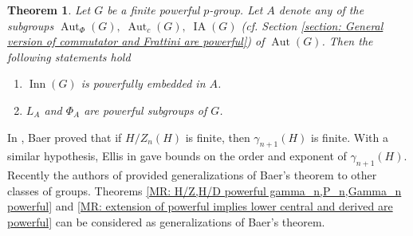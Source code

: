 \documentclass[12pt]{elsarticle}
\makeatletter
\newtheorem{theorem}{Theorem}[section]
\newtheorem*{main corollary*}{Main Corollary}
\theoremstyle{definition}
\newcommand{\settheoremtag}[1]{%
  \let\oldthetheorem\thetheorem%
  \renewcommand{\thetheorem}{#1}%
  \g@addto@macro\endtheorem{%
    \global\let\thetheorem\oldthetheorem}%
  }
\makeatother
\begin{document}
\settheoremtag{D}
\begin{theorem} \label{MR: Inn G pe Automorphism subgroups and L_A and Phi_A powerful}
Let $G$ be a finite powerful $p$-group. 
Let $A$ denote any of the subgroups $\operatorname{Aut}_\Phi(G),\; \operatorname{Aut}_c(G),\; \operatorname{IA}(G)$ (cf. Section \ref{section: General version of commutator and Frattini are powerful}) of $\operatorname{Aut}(G)$. Then the following statements hold
\begin{enumerate}
\item[(i)]  $\operatorname{Inn}(G)$ is powerfully embedded in $A$.
\item[(ii)] $L_A$ and $\Phi_A$ are powerful subgroups of $G$.
\end{enumerate}
\end{theorem}

In \cite{Baer52}, Baer proved that if $H/Z_n(H)$ is finite, then $\gamma_{n+1}(H)$ is finite. With a similar hypothesis, Ellis in \cite{Ellis2001} gave bounds on the order and exponent of $\gamma_{n+1}(H)$.  Recently the authors of \cite{Donadze2020, Donadze21} provided generalizations of Baer's theorem to other classes of groups. Theorems \ref{MR: H/Z,H/D powerful gamma_n,P_n,Gamma_n powerful} and \ref{MR: extension of powerful implies lower central and derived are powerful} can be considered as generalizations of Baer's theorem. 



\end{document}
